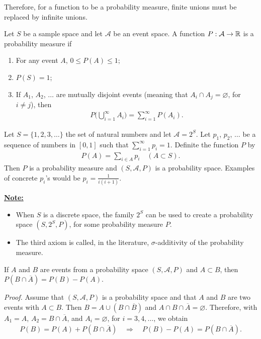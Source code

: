 Therefore, for a function to be a probability measure, finite unions must be replaced by infinite unions.

\begin{definition}
Let $S$ be a sample space and let $\mathcal{A}$ be an event space. A function $P : \mathcal{A} \rightarrow \mathbb{R}$ is a probability measure if
	\begin{enumerate}[label=\alph*)]
	\item For any event $A$, $0 \leq P (A) \leq 1$;
	\item $P (S) = 1$;
	\item If $A_1$, $A_2$, $\ldots$ are mutually disjoint events (meaning that $A_i \cap A_j = \varnothing$, for $i \neq j$), then
		\begin{align*}
		P \Big( \bigcup_{i = 1}^\infty A_i \Big) = \sum_{i = 1}^\infty P (A_i ) .
		\end{align*}
	\end{enumerate}
\end{definition}

\begin{example}
Let $S = \{ 1 , 2, 3, \ldots \}$ the set of natural numbers and let $\mathcal{A} = 2^S$. Let $p_1$, $p_2$, $\ldots$ be a sequence of numbers in $[0, 1]$ such that $\sum_{i = 1}^\infty p_i = 1$. Definite the function $P$ by
	\begin{align*}
	P (A) = \sum_{i \in A} p_i \quad (A \subset S ).
	\end{align*}
Then $P$ is a probability measure and $(S, \mathcal{A} , P )$ is a probability space. Examples of concrete $p_i$'s would be $p_i = \frac{1}{i (i + 1)}$.
\end{example}

\underline{\textbf{Note:}} 
	\begin{itemize}
		\item When $S$ is a discrete space, the family $2^S$ can be used to create a probability space $(S, 2^S , P)$, for some probability measure $P$.
		\item The third axiom is called, in the literature, $\sigma$-additivity of the probability measure.
	\end{itemize}

\begin{theorem}\label{T:ProbBMinusA}
If $A$ and $B$ are events from a probability space $(S, \mathcal{A} , P)$ and $A \subset B$, then $P (B \cap \overline{A}) = P (B) - P (A)$.
\end{theorem}

\textit{Proof.}
Assume that $(S, \mathcal{A} , P)$ is a probability space and that $A$ and $B$ are two events with $A \subset B$. Then $B = A \cup (B \cap \overline{B})$ and $A \cap B \cap \overline{A} = \varnothing$. Therefore, with $A_1 = A$, $A_2 = B \cap \overline{A}$, and $A_i = \varnothing$, for $i = 3, 4, \ldots$, we obtain
	\begin{align}
	P (B) = P (A) + P (B \cap \overline{A}) \quad \Rightarrow \quad P (B) - P (A) = P (B \cap \overline{A}) . \tag*{$\square$} 
	\end{align}

